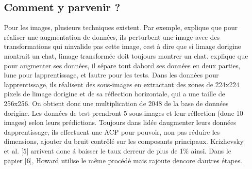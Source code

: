 \documentclass[11pt]{sdm}
\begin{document}
	\subsection{Comment y parvenir ?}
		Pour les images, plusieurs techniques existent. Par exemple, \cite{chatfield2014return} explique que pour r\'ealiser une augmentation de donn\'ees, ils perturbent une image avec des transformations qui n\textquotesingle invalide pas cette image, c\textquotesingle est \`a dire que si l\textquotesingle image d\textquotesingle origine montrait un chat, l\textquotesingle image transform\'ee doit toujours montrer un chat. \cite{krizhevsky2012imagenet} explique que pour augmenter ses donn\'ees, il s\'epare tout d\textquotesingle abord ses donn\'ees en deux parties, l\textquotesingle une pour l\textquotesingle apprentissage, et l\textquotesingle autre pour les tests. Dans les donn\'ees pour l\textquotesingle apprentissage, ils r\'ealisent des sous-images en extractant des zones de 224x224 pixels de l\textquotesingle image d\textquotesingle origine et de sa r\'eflection horizontale, qui a une taille de 256x256. On obtient donc une multiplication de 2048 de la base de donn\'ees d\textquotesingle origine. Les donn\'ees de test prendront 5 sous-images et leur r\'eflection (donc 10 images) selon leurs pr\'edictions. Toujours dans l\textquotesingle id\'ee d\textquotesingle augmenter leurs donn\'ees d\textquotesingle apprentissage, ils effectuent une ACP pour pouvoir, non pas r\'eduire les dimensions, ajouter du bruit contrôl\'e sur les composants principaux. Krizhevsky et al. [5] arrivent donc \'a baisser le taux d\textquotesingle erreur de plus de 1\% ainsi. Dans le papier [6], Howard utilise le m\^eme proc\'ed\'e mais rajoute d\textquotesingle encore d\textquotesingle autres \'etapes. 
\end{document}

